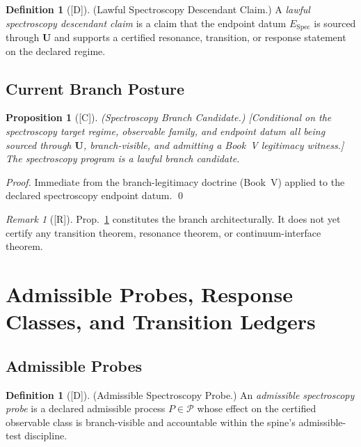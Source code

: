\documentclass[12pt,oneside]{amsbook}
\theoremstyle{plain}
\newtheorem{proposition}[theorem]{Proposition}
\theoremstyle{definition}
\newtheorem{definition}[theorem]{Definition}
\theoremstyle{remark}
\newtheorem{remark}[theorem]{Remark}
\newcommand{\status}[1]{\textup{[#1]}}
\begin{document}
\begin{definition}[\status{D}]\label{def:lawful-spec-descendant}
\textup{(Lawful Spectroscopy Descendant Claim.)}
A \emph{lawful spectroscopy descendant claim} is a claim that the endpoint
datum $E_{\mathrm{Spec}}$ is sourced through $\mathbf{U}$ and supports a
certified resonance, transition, or response statement on the declared
regime.
\end{definition}

\subsection{Current Branch Posture}\label{sec:spec-posture}

\begin{proposition}[\status{C}]\label{prop:spec-branch-candidate}
\textup{(Spectroscopy Branch Candidate.)}
\textup{[Conditional on the spectroscopy target regime, observable family,
and endpoint datum all being sourced through $\mathbf{U}$, branch-visible,
and admitting a Book~V legitimacy witness.]}
The spectroscopy program is a lawful branch candidate.
\end{proposition}

\begin{proof}
Immediate from the branch-legitimacy doctrine (Book~V) applied to the
declared spectroscopy endpoint datum. \qed
\end{proof}

\begin{remark}[\status{R}]\label{rem:spec-posture-note}
Prop.~\ref{prop:spec-branch-candidate} constitutes the branch
architecturally. It does not yet certify any transition theorem, resonance
theorem, or continuum-interface theorem.
\end{remark}

\section{Admissible Probes, Response Classes, and Transition Ledgers}
\label{sec:spec-probes}

\subsection{Admissible Probes}\label{sec:spec-admissible-probes}

\begin{definition}[\status{D}]\label{def:admissible-spec-probe}
\textup{(Admissible Spectroscopy Probe.)}
An \emph{admissible spectroscopy probe} is a declared admissible process
$P \in \mathcal{P}$ whose effect on the certified observable class is
branch-visible and accountable within the spine's admissible-test
discipline.
\end{definition}
\end{document}

